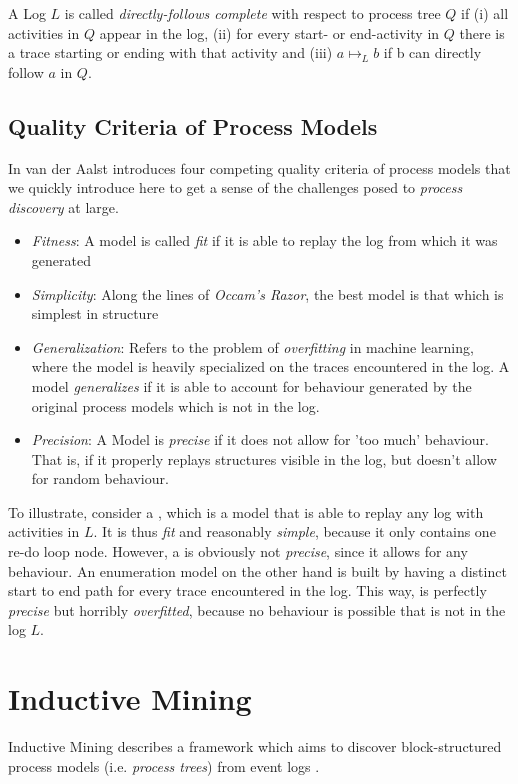 \documentclass[a4paper]{IEEEtran}
\begin{document}
A Log $L$ is called \textit{directly-follows complete} with respect to process tree $Q$ if (i) all activities in $Q$ appear in the log, (ii) for every start- or end-activity in $Q$ there is a trace starting or ending with that activity and (iii) $a \mapsto_L b$ if b can directly follow $a$ in $Q$.

\subsection{Quality Criteria of Process Models}
\label{quality}
In \cite{process_mining} van der Aalst introduces four competing quality criteria of process models that we quickly introduce here to get a sense of the challenges posed to \textit{process discovery} at large. 
\begin{itemize}
    \item \textit{Fitness}: A model is called \textit{fit} if it is able to replay the log from which it was generated
    \item \textit{Simplicity}: Along the lines of \textit{Occam's Razor}, the best model is that which is simplest in structure
    \item \textit{Generalization}: Refers to the problem of \textit{overfitting} in machine learning, where the model is heavily specialized on the traces encountered in the log. A model \textit{generalizes} if it is able to account for behaviour generated by the original process models which is not in the log. 
    \item \textit{Precision}: A Model is \textit{precise} if it does not allow for 'too much' behaviour. That is, if it properly replays structures visible in the log, but doesn't allow for random behaviour. 
\end{itemize}
To illustrate, consider a , which is a model that is able to replay any log with activities in $L$. It is thus \textit{fit} and reasonably \textit{simple}, because it only contains one re-do loop node. However, a  is obviously not \textit{precise}, since it allows for any behaviour. An enumeration model  on the other hand is built by having a distinct start to end path for every trace encountered in the log. This way,  is perfectly \textit{precise} but horribly \textit{overfitted}, because no behaviour is possible that is not in the log $L$. 


\section{Inductive Mining}
\label{sec:inductivemining}
Inductive Mining describes a framework which aims to discover block-structured process models (i.e. \textit{process trees}) from event logs \cite{inductivemining-constructive}.
\end{document}
